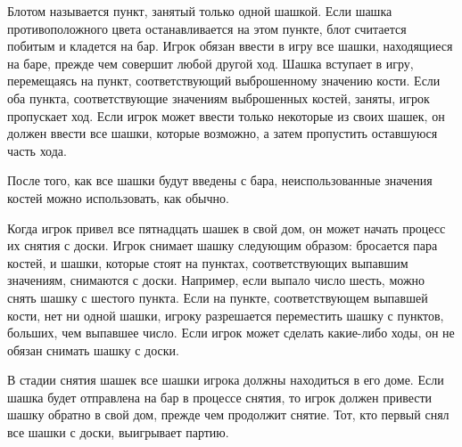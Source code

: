 Блотом называется пункт, занятый только одной шашкой. Если шашка противоположного цвета останавливается на этом пункте, блот считается побитым и кладется на бар. Игрок обязан ввести в игру все шашки, находящиеся на баре, прежде чем совершит любой другой ход. Шашка вступает в игру, перемещаясь на пункт, соответствующий выброшенному значению кости. Если оба пункта, соответствующие значениям выброшенных костей, заняты, игрок пропускает ход. Если игрок может ввести только некоторые из своих шашек, он должен ввести все шашки, которые возможно, а затем пропустить оставшуюся часть хода.

После того, как все шашки будут введены с бара, неиспользованные значения костей можно использовать, как обычно.

Когда игрок привел все пятнадцать шашек в свой дом, он может начать процесс их снятия с доски. Игрок снимает шашку следующим образом: бросается пара костей, и шашки, которые стоят на пунктах, соответствующих выпавшим значениям, снимаются с доски. Например, если выпало число шесть, можно снять шашку с шестого пункта. Если на пункте, соответствующем выпавшей кости, нет ни одной шашки, игроку разрешается переместить шашку с пунктов, больших, чем выпавшее число. Если игрок может сделать какие-либо ходы, он не обязан снимать шашку с доски.

В стадии снятия шашек все шашки игрока должны находиться в его доме. Если шашка будет отправлена на бар в процессе снятия, то игрок должен привести шашку обратно в свой дом, прежде чем продолжит снятие. Тот, кто первый снял все шашки с доски, выигрывает партию.
